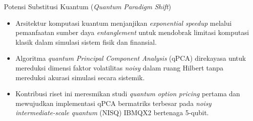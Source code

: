 \begin{frame}{Potensi Substitusi Kuantum (\textit{Quantum Paradigm Shift})}
    \begin{itemize}
        \item Arsitektur komputasi kuantum menjanjikan \textit{exponential speedup} melalui pemanfaatan sumber daya \textit{entanglement} untuk mendobrak limitasi komputasi klasik dalam simulasi sistem fisik dan finansial.
        \item Algoritma \textit{quantum Principal Component Analysis} (qPCA) direkayasa untuk mereduksi dimensi faktor volatilitas \textit{noisy} dalam ruang Hilbert tanpa mereduksi akurasi simulasi secara sistemik.
        \item Kontribusi riset ini meresmikan studi \textit{quantum option pricing} pertama dan mewujudkan implementasi qPCA bermatriks terbesar pada \textit{noisy intermediate-scale quantum} (NISQ) IBMQX2 bertenaga 5-qubit.
    \end{itemize}
\end{frame}

